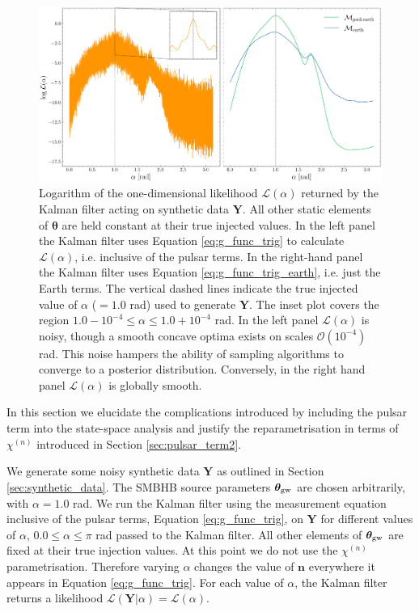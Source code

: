 \documentclass[fleqn,usenatbib,useAMS]{mnras}
\begin{document}
\begin{figure}
	\includegraphics[width=\textwidth, height =0.5\textwidth ]{images/Likelihoods_alpha}
	\caption{Logarithm of the one-dimensional likelihood $\mathcal{L}(\alpha)$ returned by the Kalman filter acting on synthetic data $\boldsymbol{Y}$. All other static elements of $\boldsymbol{\theta}$ are held constant at their true injected values. In the left panel the Kalman filter uses Equation \eqref{eq:g_func_trig} to calculate $\mathcal{L}(\alpha)$, i.e. inclusive of the pulsar terms. In the right-hand panel the Kalman filter uses Equation \ref{eq:g_func_trig_earth}, i.e. just the Earth terms. The vertical dashed lines indicate the true injected value of $\alpha$ ($=1.0$ rad) used to generate $\boldsymbol{Y}$. The inset plot covers the region $1.0 - 10^{-4} \le \alpha \le 1.0 +10^{-4}$ rad. In the left panel $\mathcal{L}(\alpha)$ is noisy, though a smooth concave optima exists on scales $\mathcal{O}(10^{-4})$ rad. This noise hampers the ability of sampling algorithms to converge to a posterior distribution. Conversely, in the right hand panel $\mathcal{L}(\alpha)$ is globally smooth. }
	\label{fig:likelihood_comparison}
\end{figure}
In this section we elucidate the complications introduced by including the pulsar term into the state-space analysis and justify the reparametrisation in terms of $\chi^{(n)}$ introduced in Section \ref{sec:pulsar_term2}. \newline 





We generate some noisy synthetic data $\boldsymbol{Y}$ as outlined in Section \ref{sec:synthetic_data}. The SMBHB source parameters $\boldsymbol{\theta}_{\rm gw}$ are chosen arbitrarily, with $\alpha = 1.0 $ rad. We run the Kalman filter using the measurement equation inclusive of the pulsar terms, Equation \eqref{eq:g_func_trig}, on $\boldsymbol{Y}$ for different values of $\alpha$, $ 0.0 \le \alpha \le \pi$ rad passed to the  Kalman filter. All other elements of $\boldsymbol{\theta}_{\rm gw}$ are fixed at their true injection values. At this point we do not use the $\chi^{(n)}$ parametrisation. Therefore varying $\alpha$ changes the value of $\boldsymbol{n}$ everywhere it appears in Equation \eqref{eq:g_func_trig}. For each value of $\alpha$, the Kalman filter returns a likelihood $\mathcal{L}(\boldsymbol{Y} | \alpha) = \mathcal{L}(\alpha)$. \newline 
\end{document}

